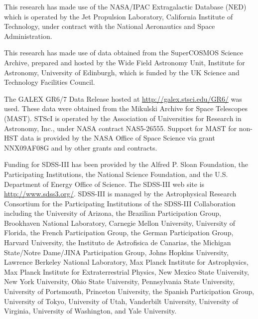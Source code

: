 \documentclass[a4paper,fleqn,usenatbib]{mnras}
\begin{document}
This research has made use of the NASA/IPAC Extragalactic Database
(NED) which is operated by the Jet Propulsion Laboratory, California
Institute of Technology, under contract with the National Aeronautics
and Space Administration.

This research has made use of data obtained from the SuperCOSMOS
Science Archive, prepared and hosted by the Wide Field Astronomy Unit,
Institute for Astronomy, University of Edinburgh, which is funded by
the UK Science and Technology Facilities Council.

The GALEX GR6/7 Data Release hosted at
\href{http://galex.stsci.edu/GR6/}{http://galex.stsci.edu/GR6/} was
used. These data were obtained from the Mikulski Archive for Space
Telescopes (MAST). STScI is operated by the Association of
Universities for Research in Astronomy, Inc., under NASA contract
NAS5-26555. Support for MAST for non-HST data is provided by the NASA
Office of Space Science via grant NNX09AF08G and by other grants and
contracts.

Funding for SDSS-III has been provided by the Alfred P. Sloan
Foundation, the Participating Institutions, the National Science
Foundation, and the U.S. Department of Energy Office of Science. The
SDSS-III web site is
\href{http://www.sdss3.org/}{http://www.sdss3.org/}.
SDSS-III is managed by the Astrophysical Research Consortium for the
Participating Institutions of the SDSS-III Collaboration including the
University of Arizona, the Brazilian Participation Group, Brookhaven
National Laboratory, Carnegie Mellon University, University of
Florida, the French Participation Group, the German Participation
Group, Harvard University, the Instituto de Astrofisica de Canarias,
the Michigan State/Notre Dame/JINA Participation Group, Johns Hopkins
University, Lawrence Berkeley National Laboratory, Max Planck
Institute for Astrophysics, Max Planck Institute for Extraterrestrial
Physics, New Mexico State University, New York University, Ohio State
University, Pennsylvania State University, University of Portsmouth,
Princeton University, the Spanish Participation Group, University of
Tokyo, University of Utah, Vanderbilt University, University of
Virginia, University of Washington, and Yale University.




\bsp	%
\label{lastpage}
\end{document}
